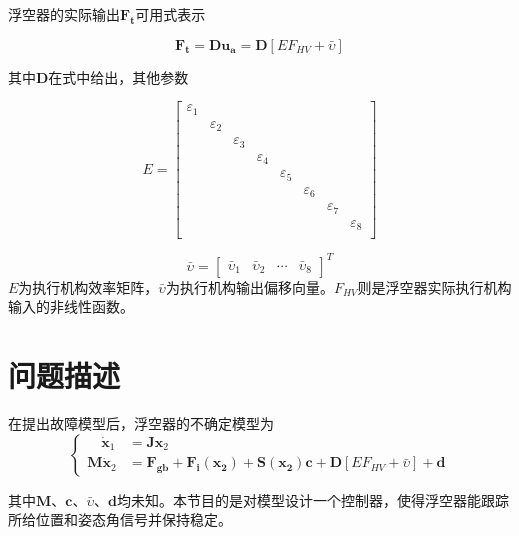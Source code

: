 浮空器的实际输出$\mathbf{F_t}$可用式表示

\begin{equation}\label{eq:inputtransc4}
    \mathbf{F_t} = \mathbf{Du_a} = \mathbf{D}[EF_{HV} + \bar{\upsilon}]
\end{equation}

其中$\mathbf{D}$在式中给出，其他参数

\begin{equation*}
    E = \left[\begin{matrix}
    \varepsilon_1&&&&&&&\\
    &\varepsilon_2&&&&&&\\
    &&\varepsilon_3&&&&&\\
    &&&\varepsilon_4&&&&\\
    &&&&\varepsilon_5&&&\\
    &&&&&\varepsilon_6&&\\
    &&&&&&\varepsilon_7&\\
    &&&&&&&\varepsilon_8\\
    \end{matrix}\right]
\end{equation*}

\begin{equation*}
    \bar{\upsilon} = \left[\begin{matrix}
    \bar{\upsilon}_1&\bar{\upsilon}_2&\cdots&\bar{\upsilon}_8
    \end{matrix}\right]^T
\end{equation*}
$E$为执行机构效率矩阵，$\bar{\upsilon}$为执行机构输出偏移向量。$F_{HV}$则是浮空器实际执行机构输入的非线性函数。

\section{问题描述}
在提出故障模型后，浮空器的不确定模型为
\begin{equation}\label{eq:4uncertainmodel}
    \begin{cases}
    \hspace{1em}\dot{\mathbf{x}}_1 &= \mathbf{J}\mathbf{x}_2\\
    \mathbf{M}\dot{\mathbf{x}}_2&=\mathbf{F_{gb}+F_{i}(x_2)}+\mathbf{S(x_2)}\mathbf{c}+\mathbf{D}[EF_{HV} + \bar{\upsilon}]+\mathbf{d}
    \end{cases}
\end{equation}

其中$\mathbf{M}$、$\mathbf{c}$、$\bar{\upsilon}$、$\mathbf{d}$均未知。本节目的是对模型设计一个控制器，使得浮空器能跟踪所给位置和姿态角信号并保持稳定。

